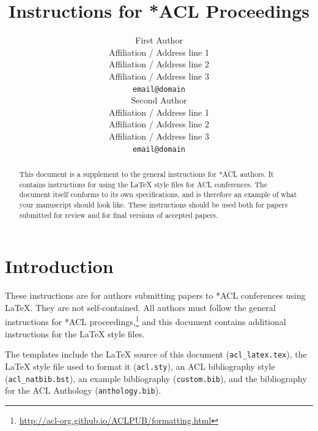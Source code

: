 \documentclass[11pt]{article}
\title{Instructions for *ACL Proceedings}
\author{First Author \\
  Affiliation / Address line 1 \\
  Affiliation / Address line 2 \\
  Affiliation / Address line 3 \\
  \texttt{email@domain} \\\And
  Second Author \\
  Affiliation / Address line 1 \\
  Affiliation / Address line 2 \\
  Affiliation / Address line 3 \\
  \texttt{email@domain} \\}
\begin{document}
\maketitle
\begin{abstract}
This document is a supplement to the general instructions for *ACL authors. It contains instructions for using the \LaTeX{} style files for ACL conferences.
The document itself conforms to its own specifications, and is therefore an example of what your manuscript should look like.
These instructions should be used both for papers submitted for review and for final versions of accepted papers.
\end{abstract}

\section{Introduction}

These instructions are for authors submitting papers to *ACL conferences using \LaTeX. They are not self-contained. All authors must follow the general instructions for *ACL proceedings,\footnote{\url{http://acl-org.github.io/ACLPUB/formatting.html}} and this document contains additional instructions for the \LaTeX{} style files.

The templates include the \LaTeX{} source of this document (\texttt{acl\_latex.tex}),
the \LaTeX{} style file used to format it (\texttt{acl.sty}),
an ACL bibliography style (\texttt{acl\_natbib.bst}),
an example bibliography (\texttt{custom.bib}),
and the bibliography for the ACL Anthology (\texttt{anthology.bib}).

\end{document}
